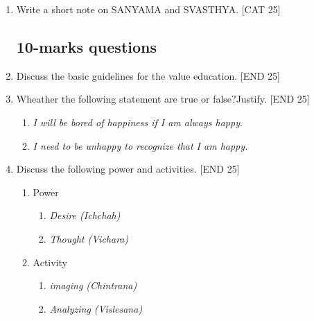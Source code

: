 \documentclass[12pt]{article}
\begin{document}
\begin{enumerate}
		
		
		
		
		
		
		
		\subsection{5-marks questions}
		
		\item Write a short note on SANYAMA and SVASTHYA. \hfill{[CAT 25]}
		
		
		
		
		
		
		
		
		
		\subsection{10-marks questions}
		
		\item Discuss the basic guidelines for the value education. \hfill{[END 25]}
		
		\item Wheather the following statement are true or false?Justify. \hfill{[END 25]}
		\begin{enumerate}
			\item \textit{I will be bored of happiness if I am always happy}.
			
			\item \textit{I need to be unhappy to recognize that I am happy.}
		\end{enumerate}
		
		\item Discuss the following power and activities. \hfill{[END 25]}
		\begin{enumerate}
			\item Power
			\begin{enumerate}
				\item \textit{Desire (Ichchah)}
				\item \textit{Thought (Vichara)}
			\end{enumerate}
			
			\item Activity
			\begin{enumerate}
				\item \textit{imaging (Chintrana)}
				\item \textit{Analyzing (Vislesana)}
			\end{enumerate}
		\end{enumerate}
		

\end{enumerate}
\end{document}
